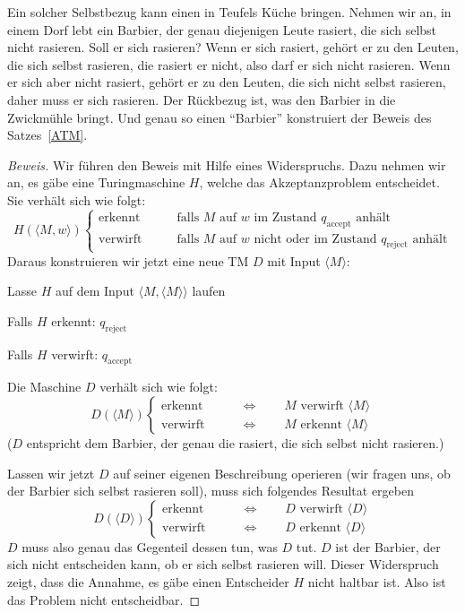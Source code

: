 Ein solcher Selbstbezug kann einen in Teufels Küche bringen.
Nehmen wir an, in einem Dorf lebt ein Barbier, der genau diejenigen
Leute rasiert, die sich selbst nicht rasieren.
Soll er sich rasieren?
Wenn er sich rasiert, gehört er zu den Leuten, die sich selbst rasieren,
die rasiert er nicht, also darf er sich nicht rasieren.
Wenn er sich
aber nicht rasiert, gehört er zu den Leuten, die sich nicht selbst
rasieren, daher muss er sich rasieren.
Der Rückbezug ist, was den
Barbier in die Zwickmühle bringt.
Und genau so einen ``Barbier''
konstruiert der Beweis des Satzes~\ref{ATM}.

\begin{proof}[Beweis]
Wir führen den Beweis mit Hilfe eines Widerspruchs.
Dazu nehmen wir
an, es gäbe eine Turingmaschine $H$, welche das Akzeptanzproblem entscheidet.
Sie verhält sich wie folgt:
\[
H(\langle M,w\rangle)\begin{cases}
\text{erkennt}&\qquad\text{falls $M$ auf $w$ im Zustand $q_{\text{accept}}$ anhält}
\\
\text{verwirft}&\qquad\text{falls $M$ auf $w$ nicht oder im Zustand $q_{\text{reject}}$ anhält}
\end{cases}
\]
Daraus konstruieren wir jetzt eine neue TM $D$ mit Input $\langle M\rangle$:
\medskip
\begin{compactenum}
\item Lasse $H$ auf dem Input $\langle M,\langle M\rangle\rangle$ laufen
\item Falls $H$ erkennt: $q_{\text{reject}}$
\item Falls $H$ verwirft: $q_{\text{accept}}$
\end{compactenum}
\medskip
Die Maschine $D$ verhält sich wie folgt:
\[
D(\langle M\rangle)\begin{cases}
\text{erkennt}&\qquad\Leftrightarrow\qquad \text{$M$ verwirft $\langle M\rangle$}
\\
\text{verwirft}&\qquad\Leftrightarrow\qquad \text{$M$ erkennt $\langle M\rangle$}
\end{cases}
\]
($D$ entspricht dem Barbier, der genau die rasiert, die sich selbst
nicht rasieren.)

Lassen wir jetzt $D$ auf seiner eigenen Beschreibung operieren
(wir fragen uns, ob der Barbier sich selbst rasieren soll), muss
sich folgendes Resultat ergeben
\[
D(\langle D\rangle)\begin{cases}
\text{erkennt}&\qquad\Leftrightarrow\qquad \text{$D$ verwirft $\langle D\rangle$}
\\
\text{verwirft}&\qquad\Leftrightarrow\qquad \text{$D$ erkennt $\langle D\rangle$}
\end{cases}
\]
$D$ muss also genau das Gegenteil dessen tun, was $D$ tut.
$D$ ist der Barbier, der sich nicht entscheiden kann, ob er sich selbst
rasieren will.
Dieser
Widerspruch zeigt, dass die Annahme, es gäbe einen Entscheider $H$
nicht haltbar ist.
Also ist das Problem nicht entscheidbar.
\end{proof}

